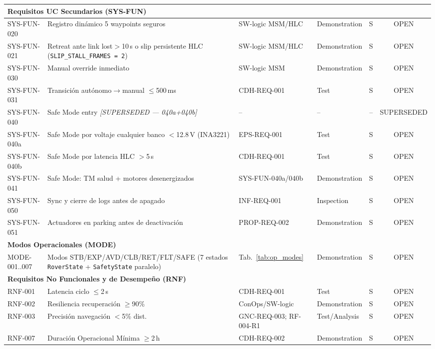 \begin{landscape}
\begin{longtable}{| l | p{4.8cm} | p{3.6cm} | l | c | c |}
\multicolumn{6}{|l|}{\textbf{Requisitos UC Secundarios (SYS-FUN)}} \\ \hline
SYS-FUN-020 & Registro dinámico 5 waypoints seguros & SW-logic MSM/HLC & Demonstration & S & OPEN \\
SYS-FUN-021 & Retreat ante link lost$>$10\,s o slip persistente HLC (\texttt{SLIP\_STALL\_FRAMES = 2}) & SW-logic MSM/HLC & Demonstration & S & OPEN \\
SYS-FUN-030 & Manual override inmediato & SW-logic MSM & Demonstration & S & OPEN \\
SYS-FUN-031 & Transición autónomo$\rightarrow$manual $\le$500\,ms & CDH-REQ-001 & Test & S & OPEN \\
SYS-FUN-040 & Safe Mode entry \textit{[SUPERSEDED — 040a+040b]} & -- & -- & -- & SUPERSEDED \\
SYS-FUN-040a & Safe Mode por voltaje cualquier banco $<$12.8\,V (INA3221) & EPS-REQ-001 & Test & S & OPEN \\
SYS-FUN-040b & Safe Mode por latencia HLC $>$5\,s & CDH-REQ-001 & Test & S & OPEN \\
SYS-FUN-041 & Safe Mode: TM salud + motores desenergizados & SYS-FUN-040a/040b & Demonstration & S & OPEN \\
SYS-FUN-050 & Sync y cierre de logs antes de apagado & INF-REQ-001 & Inspection & S & OPEN \\
SYS-FUN-051 & Actuadores en parking antes de deactivación & PROP-REQ-002 & Demonstration & S & OPEN \\ \hline

\multicolumn{6}{|l|}{\textbf{Modos Operacionales (MODE)}} \\ \hline
MODE-001..007 & Modos STB/\allowbreak EXP/\allowbreak AVD/\allowbreak CLB/\allowbreak RET/\allowbreak FLT/\allowbreak SAFE (7 estados \texttt{RoverState} + \texttt{SafetyState} paralelo) & Tab.~\ref{tab:op_modes} & Demonstration & S & OPEN \\ \hline

\multicolumn{6}{|l|}{\textbf{Requisitos No Funcionales y de Desempeño (RNF)}} \\ \hline
RNF-001 & Latencia ciclo $\le$2\,s & CDH-REQ-001 & Test & S & OPEN \\
RNF-002 & Resiliencia recuperación $\ge$90\% & ConOps/SW-logic & Demonstration & S & OPEN \\
RNF-003 & Precisión navegación $<$5\% dist. & GNC-REQ-003; RF-004-R1 & Test/Analysis & S & OPEN \\
RNF-007 & Duración Operacional Mínima $\ge$2\,h & CDH-REQ-002 & Demonstration & S & OPEN \\ \hline


\end{longtable}
\end{landscape}
